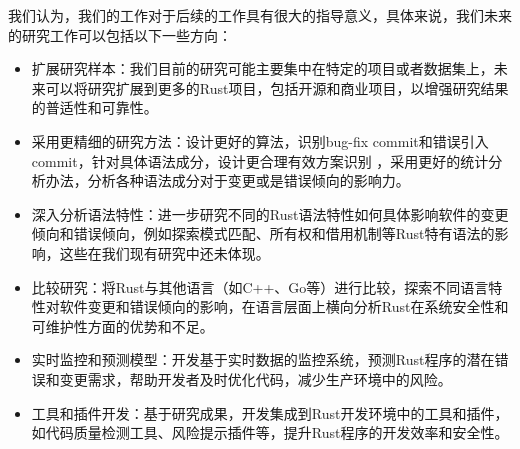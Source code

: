 我们认为，我们的工作对于后续的工作具有很大的指导意义，具体来说，我们未来的研究工作可以包括以下一些方向：

\begin{itemize}
    \item 扩展研究样本：我们目前的研究可能主要集中在特定的项目或者数据集上，未来可以将研究扩展到更多的Rust项目，包括开源和商业项目，以增强研究结果的普适性和可靠性。
    \item 采用更精细的研究方法：设计更好的算法，识别bug-fix commit和错误引入commit，针对具体语法成分，设计更合理有效方案识别
，采用更好的统计分析办法，分析各种语法成分对于变更或是错误倾向的影响力。
    \item 深入分析语法特性：进一步研究不同的Rust语法特性如何具体影响软件的变更倾向和错误倾向，例如探索模式匹配、所有权和借用机制等Rust特有语法的影响，这些在我们现有研究中还未体现。
    \item 比较研究：将Rust与其他语言（如C++、Go等）进行比较，探索不同语言特性对软件变更和错误倾向的影响，在语言层面上横向分析Rust在系统安全性和可维护性方面的优势和不足。
    \item 实时监控和预测模型：开发基于实时数据的监控系统，预测Rust程序的潜在错误和变更需求，帮助开发者及时优化代码，减少生产环境中的风险。
    \item 工具和插件开发：基于研究成果，开发集成到Rust开发环境中的工具和插件，如代码质量检测工具、风险提示插件等，提升Rust程序的开发效率和安全性。
\end{itemize}